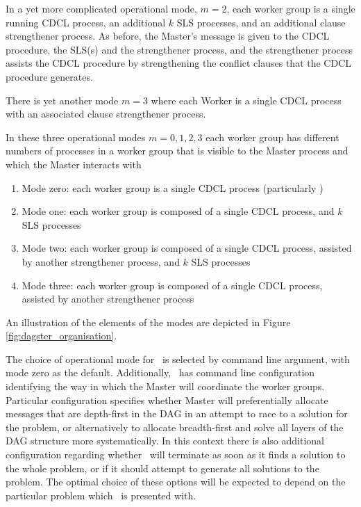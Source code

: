 \documentclass[
10pt, %
a4paper, %
oneside, %
headinclude,footinclude, %
BCOR5mm, %
]{scrartcl}
\begin{document}
In a yet more complicated operational mode, $m=2$, each worker group is a single running CDCL process, an additional $k$ SLS processes, and an additional clause strengthener process.
As before, the Master's message is given to the CDCL procedure, the SLS(s) and the strengthener process, and the strengthener process assists the CDCL procedure by strengthening
the conflict clauses that the CDCL procedure generates.

There is yet another mode $m=3$ where each Worker is a single CDCL process with an associated clause strengthener process.

In these three operational modes $m=0,1,2,3$ each worker group has different numbers of processes in a worker group that is visible to the Master process and which the Master interacts with

\begin{enumerate}
\item	Mode zero: each worker group is a single CDCL process (particularly \tinisat)
\item	Mode one: each worker group is composed of a single CDCL process, and $k$ SLS processes
\item	Mode two: each worker group is composed of a single CDCL process, assisted by another strengthener process, and $k$ SLS processes
\item	Mode three: each worker group is composed of a single CDCL process, assisted by another strengthener process
\end{enumerate}

An illustration of the elements of the modes are depicted in Figure \ref{fig:dagster_organisation}.

The choice of operational mode for \dagster\  is selected by command line argument, with mode zero as the default.
Additionally, \dagster\  has command line configuration identifying the way in which the Master will coordinate the worker groups.
Particular configuration specifies whether Master will preferentially allocate messages that are depth-first in the DAG in an attempt to race to a solution for the problem, 
or alternatively to allocate breadth-first and solve all layers of the DAG structure more systematically.
In this context there is also additional configuration regarding whether \dagster\  will terminate as soon as it finds a solution to the whole problem, or if it should attempt to generate
all solutions to the problem.
The optimal choice of these options will be expected to depend on the particular problem which \dagster\  is presented with.
\end{document}
